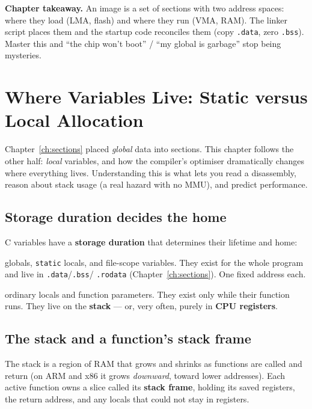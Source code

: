 \documentclass[11pt,a4paper,oneside]{book}
\newcommand{\code}[1]{\texttt{#1}}
\begin{document}
\begin{keyidea}
\textbf{Chapter takeaway.} An image is a set of sections with two address
spaces: where they load (LMA, flash) and where they run (VMA, RAM). The linker
script places them and the startup code reconciles them (copy \code{.data},
zero \code{.bss}). Master this and ``the chip won't boot'' / ``my global is
garbage'' stop being mysteries.
\end{keyidea}

\chapter{Where Variables Live: Static versus Local Allocation}
\label{ch:alloc}

Chapter~\ref{ch:sections} placed \emph{global} data into sections. This chapter
follows the other half: \emph{local} variables, and how the compiler's
optimiser dramatically changes where everything lives. Understanding this is
what lets you read a disassembly, reason about stack usage (a real hazard with
no MMU), and predict performance.

\section{Storage duration decides the home}
C variables have a \textbf{storage duration} that determines their lifetime and
home:
\begin{description}[leftmargin=1.6cm,style=nextline]
  \item[static] globals, \code{static} locals, and file-scope variables. They
        exist for the whole program and live in \code{.data}/\code{.bss}/
        \code{.rodata} (Chapter~\ref{ch:sections}). One fixed address each.
  \item[automatic] ordinary locals and function parameters. They exist only
        while their function runs. They live on the \textbf{stack} --- or, very
        often, purely in \textbf{CPU registers}.
\end{description}

\section{The stack and a function's stack frame}
The stack is a region of RAM that grows and shrinks as functions are called and
return (on ARM and x86 it grows \emph{downward}, toward lower addresses). Each
active function owns a slice called its \textbf{stack frame}, holding its
saved registers, the return address, and any locals that could not stay in
registers.
\end{document}
